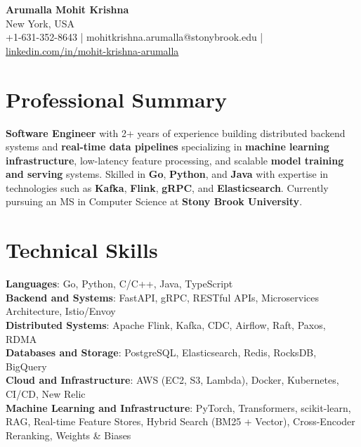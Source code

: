\documentclass[letterpaper,11pt]{article}
\begin{document}
\begin{center}
  {\Large \textbf{Arumalla Mohit Krishna}} \\
  New York, USA \\
  +1-631-352-8643 \enspace | \enspace mohitkrishna.arumalla@stonybrook.edu \enspace | \enspace \href{https://www.linkedin.com/in/mohit-krishna-arumalla}{linkedin.com/in/mohit-krishna-arumalla}
\end{center}

\section{Professional Summary}
  \begin{itemize}[leftmargin=0.15in, label={}]
    \small{\item{
     \textbf{Software Engineer} with 2+ years of experience building distributed backend systems and \textbf{real-time data pipelines} specializing in \textbf{machine learning infrastructure}, low-latency feature processing, and scalable \textbf{model training and serving} systems. Skilled in \textbf{Go}, \textbf{Python}, and \textbf{Java} with expertise in technologies such as \textbf{Kafka}, \textbf{Flink}, \textbf{gRPC}, and \textbf{Elasticsearch}. Currently pursuing an MS in Computer Science at \textbf{Stony Brook University}.
    }}
  \end{itemize}
\vspace{-16pt}

\section{Technical Skills}
 \begin{itemize}[leftmargin=0.15in, label={}]
    \small{\item{
     \textbf{Languages}: Go, Python, C/C++, Java, TypeScript \\
     \textbf{Backend and Systems}: FastAPI, gRPC, RESTful APIs, Microservices Architecture, Istio/Envoy \\
     \textbf{Distributed Systems}: Apache Flink, Kafka, CDC, Airflow, Raft, Paxos, RDMA \\
     \textbf{Databases and Storage}: PostgreSQL, Elasticsearch, Redis, RocksDB, BigQuery \\
     \textbf{Cloud and Infrastructure}: AWS (EC2, S3, Lambda), Docker, Kubernetes, CI/CD, New Relic \\
     \textbf{Machine Learning and Infrastructure}: PyTorch, Transformers, scikit-learn, RAG, Real-time Feature Stores, Hybrid Search (BM25 + Vector), Cross-Encoder Reranking, Weights \& Biases
    }}
 \end{itemize}
\vspace{-16pt}
\end{document}
